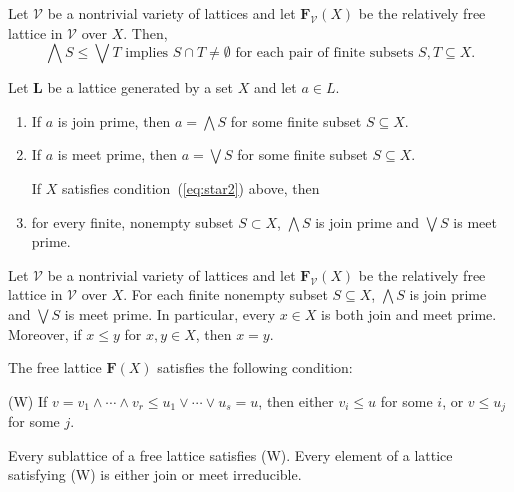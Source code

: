 \begin{lemma}
Let $\mathcal{V}$ be a nontrivial variety of lattices and let $\mathbf{F}_{\mathcal V}(X)$ be the relatively free lattice in $\mathcal V$ over $X$.  Then,
\begin{equation}
  \label{eq:star2}
\bigwedge S \leqslant \bigvee T \text{ implies }S \cap T \neq \emptyset
\text{ for each pair of finite subsets $S, T \subseteq X$.}
\end{equation}
\end{lemma}

\begin{lemma}\label{lem:prime}
Let $\mathbf L$ be a lattice generated by a set $X$ and let $a \in L$.
\begin{enumerate}
\item 
If $a$ is join prime, then $a = \bigwedge S$ for some finite subset $S \subseteq X$.
\item 
If $a$ is meet prime, then $a = \bigvee S$ for some finite subset $S \subseteq X$.

If $X$ satisfies condition~(\ref{eq:star2}) above, then 
\item for every finite, nonempty subset $S \subset X$, $\bigwedge S$ is join prime and $\bigvee S$ is meet prime.
\end{enumerate}
\end{lemma}

\begin{corollary}
Let $\mathcal V$ be a nontrivial variety of lattices and let $\mathbf{F}_{\mathcal V}(X)$ be the relatively free lattice in $\mathcal V$ over $X$.  For each finite nonempty subset $S \subseteq X$, $\bigwedge S$ is join prime and $\bigvee S$ is meet prime. In particular, every $x\in X$ is both join and meet prime.  Moreover, if $x\leqslant y$ for $x, y \in X$, then $x = y$.
\end{corollary}

\begin{theorem}  
The free lattice $\mathbf{F}(X)$ satisfies the following condition:

(W)  If $v = v_1 \wedge \cdots \wedge v_r \leqslant u_1 \vee \cdots \vee u_s = u$, 
then either $v_i \leqslant u$ for some $i$, or $v \leqslant u_j$ for some $j$. 
\end{theorem}

\begin{corollary}
Every sublattice of a free lattice satisfies (W). Every element of a lattice satisfying (W) is either join or meet irreducible.
\end{corollary}


